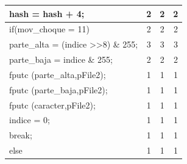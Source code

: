 \documentclass[letterpaper]{article}
\begin{document}
\begin{tabular}{|l|c|c|c|}
\hline
\hspace{3.5cm} hash = hash + 4; & 2 & 2 & 2 \\ 
\hline
\hspace{3.5cm} if(mov\_choque = 11) & 2 & 2 & 2 \\ 
\hline
\hspace{4cm} parte\_alta = (indice \textgreater\textgreater 8) \& 255; & 3 & 3 & 3 \\ 
\hline
\hspace{4cm} parte\_baja = indice \& 255; & 2 & 2 & 2 \\ 
\hline
\hspace{4cm} fputc (parte\_alta,pFile2); & 1 & 1 & 1 \\ 
\hline
\hspace{4cm} fputc (parte\_baja,pFile2); & 1 & 1 & 1 \\ 
\hline
\hspace{4cm} fputc (caracter,pFile2); & 1 & 1 & 1 \\ 
\hline
\hspace{4cm} indice = 0;  & 1 & 1 & 1 \\ 
\hline
\hspace{4cm} break; & 1 & 1 & 1 \\ 
\hline
\hspace{2cm} else & 1 & 1 & 1 \\ 
\hline
\end{tabular}
\end{document}
